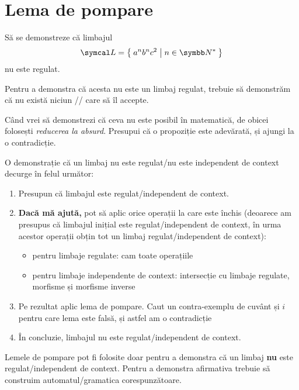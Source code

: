 \section*{Lema de pompare}

Să se demonstreze că limbajul
\[\lang = \Set{ a^n b^n c^2 | n \in \naturals^* }\]
nu este regulat.

Pentru a demonstra că acesta nu este un limbaj regulat, trebuie să demonstrăm că nu există niciun \dfa/\nfa/\lnfa{} care să îl accepte.

Când vrei să demonstrezi că ceva nu este posibil în matematică, de obicei folosești \emph{reducerea la absurd}. Presupui că o propoziție este adevărată, și ajungi la o contradicție.

O demonstrație că un limbaj nu este regulat/nu este independent de context decurge în felul următor:
\begin{enumerate}
    \item Presupun că limbajul este regulat/independent de context.

    \item \textbf{Dacă mă ajută,} pot să aplic orice operații la care este închis (deoarece am presupus că limbajul inițial este regulat/independent de context, în urma acestor operații obțin tot un limbaj regulat/independent de context):
          \begin{itemize}
              \item pentru limbaje regulate: cam toate operațiile
              \item pentru limbaje independente de context: intersecție cu limbaje regulate, morfisme și morfisme inverse
          \end{itemize}

    \item Pe rezultat aplic lema de pompare.
          Caut un contra-exemplu de cuvânt și \(i\) pentru care lema este falsă, și astfel am o contradicție

    \item În concluzie, limbajul nu este regulat/independent de context.
\end{enumerate}

\begin{observation}
    Lemele de pompare pot fi folosite doar pentru a demonstra că un limbaj \textbf{nu} este regulat/independent de context. Pentru a demonstra afirmativa trebuie să construim automatul/gramatica corespunzătoare.
\end{observation}

